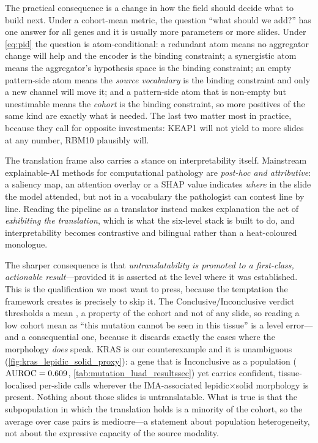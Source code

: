 The practical consequence is a change in how the field should
decide what to build next.
Under a cohort-mean metric, the question ``what should we add?''
has one answer for all genes and it is usually more parameters or
more slides.
Under \cref{eq:pid} the question is atom-conditional: a redundant
atom means no aggregator change will help and the encoder is the
binding constraint; a synergistic atom means the aggregator's
hypothesis space is the binding constraint; an empty pattern-side
atom means the \emph{source vocabulary} is the binding constraint
and only a new channel will move it; and a pattern-side atom that is
non-empty but unestimable means the \emph{cohort} is the binding
constraint, so more positives of the same kind are exactly what is
needed. The last two matter most in practice, because they call for
opposite investments: KEAP1 will not yield to more slides at any
number, RBM10 plausibly will.

The translation frame also carries a stance on interpretability itself.
Mainstream explainable-AI methods for computational pathology are
\emph{post-hoc and attributive}: a saliency map, an attention
overlay or a SHAP value indicates \emph{where} in the slide the
model attended, but not in a vocabulary the pathologist can contest
line by line.\cite{rudin2019stop,jain2019attention}
Reading the pipeline as a translator instead makes explanation the act of
\emph{exhibiting the translation}, which is what the six-level stack is
built to do, and interpretability becomes contrastive and bilingual rather
than a heat-coloured monologue.

The sharper consequence is that \emph{untranslatability is promoted
to a first-class, actionable result}---provided it is asserted at the
level where it was established.
This is the qualification we most want to press, because the
temptation the framework creates is precisely to skip it.
The Conclusive/Inconclusive verdict thresholds a mean \auroc{}, a
property of the cohort and not of any slide, so reading a low cohort
mean as ``this mutation cannot be seen in this tissue'' is a level
error---and a consequential one, because it discards exactly the cases
where the morphology \emph{does} speak.
KRAS is our counterexample and it is unambiguous
(\cref{fig:kras_lepidic_solid_proxy}): a gene that is Inconclusive as
a population ($\text{AUROC} = 0.609$, \cref{tab:mutation_luad_resultssec})
yet carries confident,
tissue-localised per-slide calls wherever the IMA-associated
lepidic$\times$solid morphology is present.
Nothing about those slides is untranslatable.
What is true is that the subpopulation in which the translation holds
is a minority of the cohort, so the average over case pairs is
mediocre---a statement about population heterogeneity, not about the
expressive capacity of the source modality.

